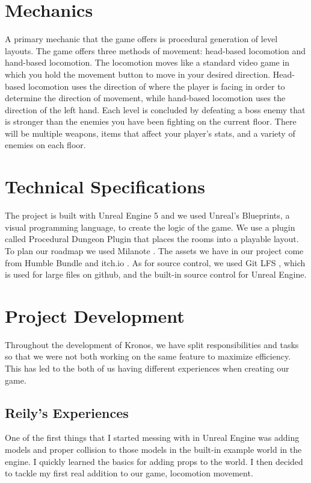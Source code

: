 \documentclass{sigchi}
\begin{document}
\section{Mechanics}
A primary mechanic that the game offers is procedural generation of level layouts. The game offers three methods of movement: head-based locomotion and hand-based locomotion. The locomotion moves like a standard video game in which you hold the movement button to move in your desired direction. Head-based locomotion uses the direction of where the player is facing in order to determine the direction of movement, while hand-based locomotion uses the direction of the left hand. Each level is concluded by defeating a boss enemy that is stronger than the enemies you have been fighting on the current floor. There will be multiple weapons, items that affect your player's stats, and a variety of enemies on each floor.

\section{Technical Specifications}
The project is built with Unreal Engine 5 \cite{unrealweb} and we used Unreal's Blueprints, a visual programming language, to create the logic of the game. We use a plugin called Procedural Dungeon Plugin \cite{dungeonplugin} that places the rooms into a playable layout. To plan our roadmap we used Milanote \cite{milanote}. The assets we have in our project come from Humble Bundle \cite{humble} and itch.io \cite{itch}. As for source control, we used Git LFS \cite{gitlfs}, which is used for large files on github, and the built-in source control for Unreal Engine.

\section{Project Development}
Throughout the development of Kronos, we have split responsibilities and tasks so that we were not both working on the same feature to maximize efficiency. This has led to the both of us having different experiences when  creating our game.

\subsection*{Reily's Experiences} One of the first things that I started messing with in Unreal Engine was adding models and proper collision to those models in the built-in example world in the engine. I quickly learned the basics for adding props to the world. I then decided to tackle my first real addition to our game, locomotion movement.
\end{document}

